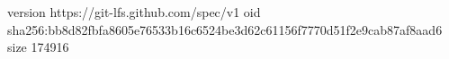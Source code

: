 version https://git-lfs.github.com/spec/v1
oid sha256:bb8d82fbfa8605e76533b16c6524be3d62c61156f7770d51f2e9cab87af8aad6
size 174916
